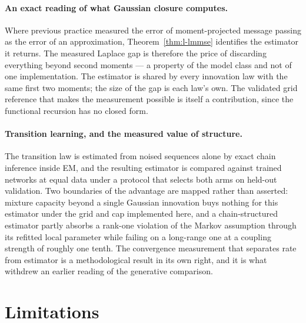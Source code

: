 \paragraph{An exact reading of what Gaussian closure computes.} Where previous
practice measured the error of moment-projected message passing as the error of
an approximation, Theorem~\ref{thm:l-lmmse} identifies the estimator it returns.
The measured Laplace gap is therefore the price of discarding everything beyond
second moments --- a property of the model class and not of one
implementation. The estimator is shared by every innovation law with the same
first two moments; the size of the gap is each law's own.
The validated grid reference that makes the measurement possible is itself a
contribution, since the functional recursion has no closed form.

\paragraph{Transition learning, and the measured value of structure.} The
transition law is estimated from noised sequences alone by exact chain inference
inside EM, and the resulting estimator is compared against trained networks at
equal data under a protocol that selects both arms on held-out validation. Two
boundaries of the advantage are mapped rather than asserted: mixture capacity
beyond a single Gaussian innovation buys nothing for this estimator under the
grid and cap implemented here, and a chain-structured estimator partly absorbs a rank-one violation of the
Markov assumption through its refitted local parameter while failing on a
long-range one at a coupling strength of roughly one tenth. The convergence
measurement that separates rate from estimator is a methodological result in its
own right, and it is what withdrew an earlier reading of the generative
comparison.

\section{Limitations}

